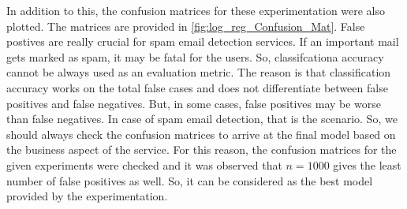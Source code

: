\documentclass[11pt]{article}
\begin{document}
In addition to this, the confusion matrices for these experimentation were also plotted. The matrices are provided in \autoref{fig:log_reg_Confusion_Mat}. False postives are really crucial for spam email detection services. If an important mail gets marked as spam, it may be fatal for the users. So, classifcationa accuracy cannot be always used as an evaluation metric. The reason is that classification accuracy works on the total false cases and does not differentiate between false positives and false negatives. But, in some cases, false positives may be worse than false negatives. In case of spam email detection, that is the scenario. So, we should always check the confusion matrices to arrive at the final model based on the business aspect of the service. For this reason, the confusion matrices for the given experiments were checked and it was observed that $n=1000$ gives the least number of false positives as well. So, it can be considered as the best model provided by the experimentation.
\end{document}

